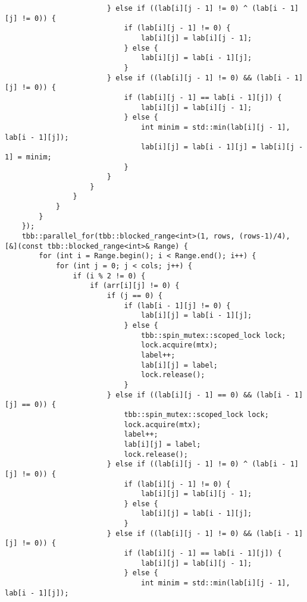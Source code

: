 \documentclass{report}
\begin{document}
\begin{lstlisting}
                        } else if ((lab[i][j - 1] != 0) ^ (lab[i - 1][j] != 0)) {
                            if (lab[i][j - 1] != 0) {
                                lab[i][j] = lab[i][j - 1];
                            } else {
                                lab[i][j] = lab[i - 1][j];
                            }
                        } else if ((lab[i][j - 1] != 0) && (lab[i - 1][j] != 0)) {
                            if (lab[i][j - 1] == lab[i - 1][j]) {
                                lab[i][j] = lab[i][j - 1];
                            } else {
                                int minim = std::min(lab[i][j - 1], lab[i - 1][j]);
                                lab[i][j] = lab[i - 1][j] = lab[i][j - 1] = minim;
                            }
                        }
                    } 
                }  
            }
        }
    });
    tbb::parallel_for(tbb::blocked_range<int>(1, rows, (rows-1)/4), [&](const tbb::blocked_range<int>& Range) {
        for (int i = Range.begin(); i < Range.end(); i++) {
            for (int j = 0; j < cols; j++) {
                if (i % 2 != 0) {
                    if (arr[i][j] != 0) {
                        if (j == 0) {
                            if (lab[i - 1][j] != 0) {
                                lab[i][j] = lab[i - 1][j];
                            } else {
                                tbb::spin_mutex::scoped_lock lock;
                                lock.acquire(mtx);
                                label++;
                                lab[i][j] = label;
                                lock.release();
                            }
                        } else if ((lab[i][j - 1] == 0) && (lab[i - 1][j] == 0)) {
                            tbb::spin_mutex::scoped_lock lock;
                            lock.acquire(mtx);
                            label++;
                            lab[i][j] = label;
                            lock.release();
                        } else if ((lab[i][j - 1] != 0) ^ (lab[i - 1][j] != 0)) {
                            if (lab[i][j - 1] != 0) {
                                lab[i][j] = lab[i][j - 1];
                            } else {
                                lab[i][j] = lab[i - 1][j];
                            }
                        } else if ((lab[i][j - 1] != 0) && (lab[i - 1][j] != 0)) {
                            if (lab[i][j - 1] == lab[i - 1][j]) {
                                lab[i][j] = lab[i][j - 1];
                            } else {
                                int minim = std::min(lab[i][j - 1], lab[i - 1][j]);

\end{lstlisting}
\end{document}
